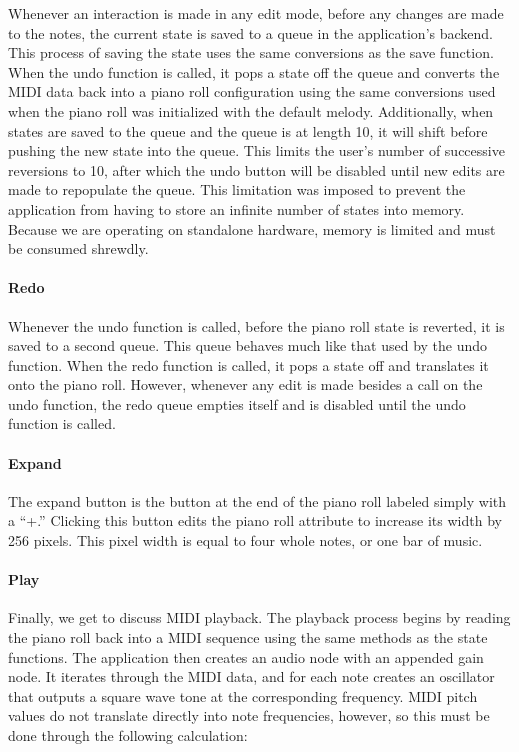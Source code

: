 Whenever an interaction is made in any edit mode, before any changes are made to the notes, the
current state is saved to a queue in the application’s backend. This process of saving the state
uses the same conversions as the save function. When the undo function is called, it pops a state
off the queue and converts the MIDI data back into a piano roll configuration using the same
conversions used when the piano roll was initialized with the default melody. Additionally, when
states are saved to the queue and the queue is at length 10, it will shift before pushing the new
state into the queue. This limits the user’s number of successive reversions to 10, after which
the undo button will be disabled until new edits are made to repopulate the queue. This
limitation was imposed to prevent the application from having to store an infinite number of
states into memory. Because we are operating on standalone hardware, memory is limited and must be
consumed shrewdly.

\paragraph{Redo}

Whenever the undo function is called, before the piano roll state is reverted, it is saved to a
second queue. This queue behaves much like that used by the undo function. When the redo function
is called, it pops a state off and translates it onto the piano roll. However, whenever any edit is
made besides a call on the undo function, the redo queue empties itself and is disabled until the
undo function is called.

\paragraph{Expand}

The expand button is the button at the end of the piano roll labeled simply with a “+.” Clicking
this button edits the piano roll attribute to increase its width by 256 pixels. This pixel width
is equal to four whole notes, or one bar of music.

\paragraph{Play}

Finally, we get to discuss MIDI playback. The playback process begins by reading the piano roll
back into a MIDI sequence using the same methods as the state functions. The application then
creates an audio node with an appended gain node. It iterates through the MIDI data, and for each
note creates an oscillator that outputs a square wave tone at the corresponding frequency. MIDI
pitch values do not translate directly into note frequencies, however, so this must be done through
the following calculation:


